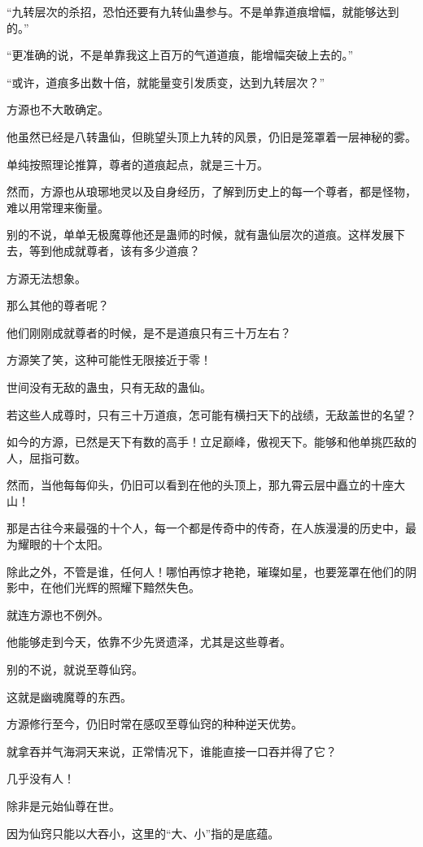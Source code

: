 \begin{this_body}
“九转层次的杀招，恐怕还要有九转仙蛊参与。不是单靠道痕增幅，就能够达到的。”

“更准确的说，不是单靠我这上百万的气道道痕，能增幅突破上去的。”

“或许，道痕多出数十倍，就能量变引发质变，达到九转层次？”

方源也不大敢确定。

他虽然已经是八转蛊仙，但眺望头顶上九转的风景，仍旧是笼罩着一层神秘的雾。

单纯按照理论推算，尊者的道痕起点，就是三十万。

然而，方源也从琅琊地灵以及自身经历，了解到历史上的每一个尊者，都是怪物，难以用常理来衡量。

别的不说，单单无极魔尊他还是蛊师的时候，就有蛊仙层次的道痕。这样发展下去，等到他成就尊者，该有多少道痕？

方源无法想象。

那么其他的尊者呢？

他们刚刚成就尊者的时候，是不是道痕只有三十万左右？

方源笑了笑，这种可能性无限接近于零！

世间没有无敌的蛊虫，只有无敌的蛊仙。

若这些人成尊时，只有三十万道痕，怎可能有横扫天下的战绩，无敌盖世的名望？

如今的方源，已然是天下有数的高手！立足巅峰，傲视天下。能够和他单挑匹敌的人，屈指可数。

然而，当他每每仰头，仍旧可以看到在他的头顶上，那九霄云层中矗立的十座大山！

那是古往今来最强的十个人，每一个都是传奇中的传奇，在人族漫漫的历史中，最为耀眼的十个太阳。

除此之外，不管是谁，任何人！哪怕再惊才艳艳，璀璨如星，也要笼罩在他们的阴影中，在他们光辉的照耀下黯然失色。

就连方源也不例外。

他能够走到今天，依靠不少先贤遗泽，尤其是这些尊者。

别的不说，就说至尊仙窍。

这就是幽魂魔尊的东西。

方源修行至今，仍旧时常在感叹至尊仙窍的种种逆天优势。

就拿吞并气海洞天来说，正常情况下，谁能直接一口吞并得了它？

几乎没有人！

除非是元始仙尊在世。

因为仙窍只能以大吞小，这里的“大、小”指的是底蕴。


\end{this_body}
